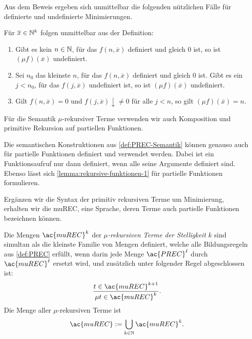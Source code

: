 Aus dem Beweis ergeben sich unmittelbar die folgenden nützlichen Fälle für
definierte und undefinierte Minimierungen.
\begin{Beobachtung}
	Für $\overline{x}\in\mathbb{N}^k$ folgen unmittelbar aus der Definition:
	\begin{enumerate}
	\item Gibt es kein $n\in\mathbb{N}$, für das $f(n,\overline{x})$ definiert und
		gleich $0$ ist, so ist $(\mu f)(\overline{x})$ undefiniert.
	\item Sei $n_0$ das kleinste $n$, für das $f(n,\overline{x})$ definiert und
		gleich $0$ ist. Gibt es ein $j<n_0$, für das $f(j,\overline{x})$
		undefiniert ist, so ist $(\mu f)(\overline{x})$ undefiniert.
	\item Gilt $f(n,\overline{x})=0$ und
		$f(j,\overline{x})\downarrow\ne0$ für alle $j<n$, so gilt
		$(\mu f)(\overline{x})=n$.
	\end{enumerate}
\end{Beobachtung}

Für die Semantik $\mu$-rekursiver Terme verwenden wir auch Komposition und
primitive Rekursion auf partiellen Funktionen.
\begin{Bemerkung}
  Die semantischen Konstruktionen aus \autoref{def:PREC-Semantik} können
  genauso auch für partielle Funktionen definiert und verwendet werden. Dabei
  ist ein Funktionsaufruf nur dann definiert, wenn alle seine Argumente
  definiert sind. Ebenso lässt sich
  \autoref{lemma:rekursive-funktionen-1} für partielle Funktionen formulieren.
\end{Bemerkung}

Ergänzen wir die Syntax der primitiv rekursiven Terme um Minimierung, erhalten
wir die \acf{muREC}, eine Sprache, deren Terme auch partielle Funktionen
bezeichnen können.
\begin{Def}[name={Syntax der \acs*{muREC}}]\label{def:muREC-Syntax}
  Die Mengen $\ac{muREC}^k$ der \emph{$\mu$-rekursiven Terme der Stelligkeit
  $k$} sind simultan als die kleinste Familie von Mengen definiert, welche alle
  Bildungsregeln aus \autoref{def:PREC} erfüllt, wenn darin jede Menge
  $\ac{PREC}^{\ell}$ durch $\ac{muREC}^{\ell}$ ersetzt wird, und zusätzlich
  unter folgender Regel abgeschlossen ist:
  \[
    \frac{t\in\ac{muREC}^{k+1}}{\mu t\in\ac{muREC}^{k}}.
  \]
  Die Menge aller $\mu$-rekursiven Terme ist
  \[
    \ac{muREC}:=\bigcup_{k\in\N}\ac{muREC}^k.
  \]
\end{Def}

